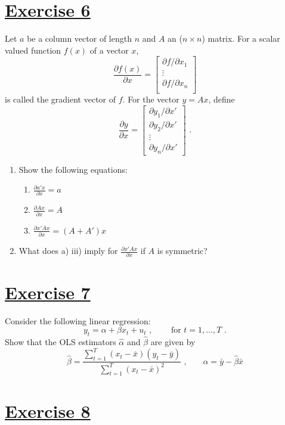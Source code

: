 \documentclass[captions=tableheading, 12pt, headings=small, parskip=half]{scrartcl}
\begin{document}
\section*{\underline{Exercise 6}}
Let $a$ be a column vector of length $n$ and $A$ an ($n\times n$) matrix. For a scalar valued function $f(x)$ of a vector $x$,
\[ \frac{\partial f(x)}{\partial x} = \left[
\begin{array}{c} 
\partial f/\partial x_1\\
\vdots\\
\partial f/\partial x_n\\
\end{array} \right] \]
is called the gradient vector of $f$. For the vector $y = Ax$, define
\[
\frac{\partial y}{\partial x} = \begin{bmatrix}
\partial y_1/\partial x'\\
\partial y_2/\partial x'\\
\vdots\\
\partial y_n/\partial x'
\end{bmatrix}\text{ .}
\]

\begin{enumerate}[label = \alph*)]
	\item Show the following equations:
	\begin{enumerate}[label = \roman*)]
		\item $\frac{\partial a'x}{\partial x} = a$
		\item $\frac{\partial Ax}{\partial x} = A$
		\item $\frac{\partial x'Ax}{\partial x} = (A + A')x$
	\end{enumerate}
	\item What does a) iii) imply for $\frac{\partial x'Ax}{\partial x}$ if $A$ is symmetric?
\end{enumerate}


\section*{\underline{Exercise 7}}

Consider the following linear regression:
\[
y_t = \alpha + \beta x_t + u_t\text{ ,}\qquad\text{ for }t=1,...,T\text{ .}
\]Show that the OLS estimators $\hat{\alpha}$ and $\hat{\beta}$ are given by
\[
\hat{\beta} = \frac{\sum_{t = 1}^T{(x_t - \bar{x})(y_t - \bar{y})}}{\sum_{t = 1}^T{(x_t - \bar{x})^2}}\text{ ,}\qquad \hat{\alpha} = \bar{y} - \hat{\beta}\bar{x}
\]

\section*{\underline{Exercise 8}}
\end{document}
